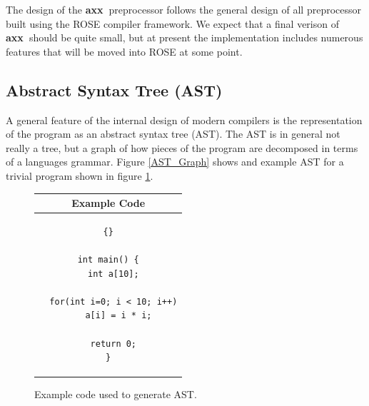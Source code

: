 \documentclass[10pt]{article}
\newcommand{\axx}{{\bf axx\ }}
\begin{document}
    The design of the \axx preprocessor follows the general design of all preprocessor built using the
ROSE compiler framework. We expect that a final verison of \axx should be quite small, but at present
the implementation includes numerous features that will be moved into ROSE at some point.

\subsection{Abstract Syntax Tree (AST)}

     A general feature of the internal design of modern compilers is the representation of the
program as an abstract syntax tree (AST).  The AST is in general not really a tree, but a graph of
how pieces of the program are decomposed in terms of a languages grammar.  Figure \ref{AST_Graph} shows and
example AST for a trivial program shown in figure \ref{AST_Code}.

\begin{figure}[tb]
\begin{center}
\begin{tabular}{|c|} \hline
 Example Code \\\hline\hline
\begin{lstlisting}{}

int main() {
  int a[10];

  for(int i=0; i < 10; i++)
    a[i] = i * i;

  return 0;
}

\end{lstlisting}
\\\hline
\end{tabular}
\end{center}
\caption{ Example code used to generate AST. }
\label{AST_Code}
\end{figure}
\end{document}
